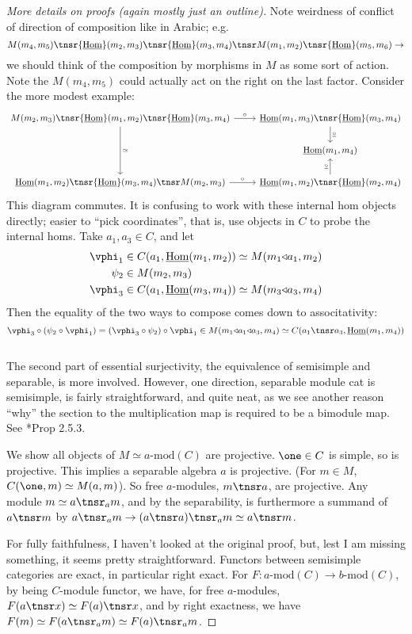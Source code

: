 \documentclass[12pt]{article}
\newcommand{\amod}[1]{{#1\textrm{-mod}}}
\newcommand{\ihom}{{\underline{\textrm{Hom}}}}
\newcommand{\ract}{{\triangleleft}}
\newcommand{\icirc}{{\underline{\circ}}}
\begin{document}
\begin{proof}[More details on proofs (again mostly just an outline)]
Note weirdness of conflict of direction of composition
like in Arabic;
e.g.
\[
M(m_4,m_5) \tnsr
\ihom(m_2,m_3) \tnsr \ihom(m_3,m_4) \tnsr
M(m_1,m_2) \tnsr
\ihom(m_5,m_6)
\to
\]
we should think of the composition by
morphisms in $M$ as some sort of action.
Note the $M(m_4,m_5)$ could actually act
on the right on the last factor.
Consider the more modest example:
\[
\begin{tikzcd}
M(m_2,m_3) \tnsr \ihom(m_1,m_2) \tnsr \ihom(m_3,m_4)
\ar[r,"\circ"] \ar[dd,"\simeq"]
& \ihom(m_1,m_3) \tnsr \ihom(m_3,m_4)
\ar[d,"\icirc"]
\\
& \ihom(m_1,m_4)
\\
\ihom(m_1,m_2) \tnsr \ihom(m_3,m_4) \tnsr M(m_2,m_3)
\ar[r,"\circ"]
& \ihom(m_1,m_2) \tnsr \ihom(m_2,m_4)
\ar[u,"\icirc"]
\end{tikzcd}
\]
This diagram commutes.
It is confusing to work with these internal hom objects
directly; easier to ``pick coordinates'',
that is, use objects in $C$ to probe the internal homs.
Take $a_1,a_3 \in C$, and let
\begin{align*}
\vphi_1 &\in C(a_1, \ihom(m_1,m_2)) \simeq M(m_1 \ract a_1,m_2)
\\
\psi_2 &\in M(m_2,m_3)
\\
\vphi_3 &\in C(a_1, \ihom(m_3,m_4)) \simeq M(m_3 \ract a_3,m_4)
\end{align*}
Then the equality of the two ways to compose
comes down to associtativity:
\[
\vphi_3 \circ (\psi_2 \circ \vphi_1)
= (\vphi_3 \circ \psi_2) \circ \vphi_1
\in M(m_1 \ract a_1 \ract a_3, m_4)
\simeq C(a_1 \tnsr a_3, \ihom(m_1,m_4))
\]
\\

The second part of essential surjectivity,
the equivalence of semisimple and separable,
is more involved.
However, one direction, separable module cat
is semisimple, is fairly straightforward,
and quite neat,
as we see another reason ``why'' the section to the
multiplication map is required to be a bimodule map.
See \cite{DSPSb}*{Prop 2.5.3}.

We show all objects of $M \simeq \amod{a}(C)$ are projective.
$\one \in C$ is simple, so is projective.
This implies a separable algebra $a$ is projective.
(For $m \in M$, $C(\one, m) \simeq M(a,m)$).
So free $a$-modules, $m \tnsr a$, are projective.
Any module $m \simeq a \tnsr_a m$,
and by the separability,
is furthermore a summand of $a \tnsr m$ by
$a \tnsr_a m \to (a \tnsr a) \tnsr_a m
\simeq a \tnsr m$.


For fully faithfulness,
I haven't looked at the original proof,
but, lest I am missing something,
it seems pretty straightforward.
Functors between semisimple categories are exact,
in particular right exact.
For $F: \amod{a}(C) \to \amod{b}(C)$,
by being $C$-module functor,
we have, for free $a$-modules,
$F(a \tnsr x) \simeq F(a) \tnsr x$,
and by right exactness, we have
$F(m) \simeq F(a \tnsr_a m) \simeq F(a) \tnsr_a m$.
\end{proof}
\end{document}
